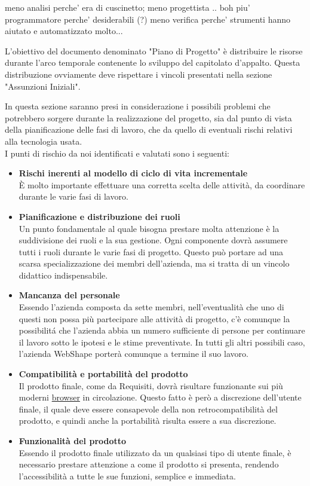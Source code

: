 meno analisi perche' era di cuscinetto;
meno progettista .. boh
piu' programmatore perche' desiderabili (?)
meno verifica perche' strumenti hanno aiutato e automatizzato molto...

\newpage

L'obiettivo del documento denominato "Piano di Progetto" \`e distribuire le risorse durante l'arco temporale 
contenente lo sviluppo del capitolato d'appalto. Questa distribuzione ovviamente deve rispettare i vincoli presentati 
nella sezione "Assunzioni Iniziali".

In questa sezione saranno presi in considerazione i possibili problemi che potrebbero sorgere durante la realizzazione del progetto, sia dal punto di vista della pianificazione delle fasi di lavoro, che da quello di eventuali rischi relativi alla tecnologia usata.\\
I punti di rischio da noi identificati e valutati sono i seguenti:
\begin{itemize}
\item \textbf{Rischi inerenti al modello di ciclo di vita incrementale}\\
\`E molto importante effettuare una corretta scelta delle attivit\`a, da coordinare durante le varie fasi di lavoro.
\item \textbf{Pianificazione e distribuzione dei ruoli}\\
Un punto fondamentale al quale bisogna prestare molta attenzione \`e la suddivisione dei ruoli e la sua gestione. Ogni componente dovr\`a assumere tutti i ruoli durante le varie fasi di progetto. Questo pu\`o portare ad una scarsa specializzazione dei membri dell'azienda, ma si tratta di un vincolo didattico indispensabile.
\item \textbf{Mancanza del personale}\\
Essendo l'azienda composta da sette membri, nell'eventualit\`a che uno di questi non possa pi\`u partecipare alle attivit\`a di progetto, c'\`e comunque la possibilit\'a che l'azienda abbia un numero sufficiente di persone per continuare il lavoro sotto le ipotesi e le stime preventivate. In tutti gli altri possibili caso, l'azienda WebShape porter\`a comunque a termine il suo lavoro.
\item \textbf{Compatibilit\`a e portabilit\`a del prodotto}\\
Il prodotto finale, come da Requisiti, dovr\`a risultare funzionante sui pi\`u moderni {\underline{browser}} in circolazione. Questo fatto \`e per\`o  a discrezione dell'utente finale, il quale deve essere consapevole della non retrocompatibilit\`a del prodotto, e quindi anche la portabilit\`a risulta essere  a sua discrezione.
\item \textbf{Funzionalit\`a del prodotto}\\
Essendo il prodotto finale utilizzato da un qualsiasi tipo di utente finale, \`e necessario prestare attenzione a come il prodotto si presenta, rendendo l'accessibilit\`a a tutte le sue funzioni, semplice e immediata.
\end{itemize}			



